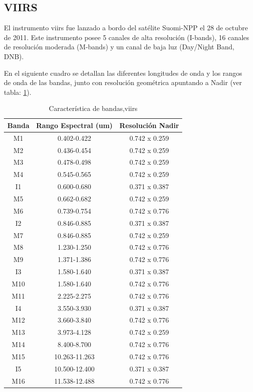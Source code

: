 \subsection{VIIRS}\label{sub:viirs}
El instrumento \ac{viirs} fue lanzado a bordo del satélite Suomi-NPP el 28 de octubre de 2011. Este instrumento posee 5 canales de alta resolución (I-bands), 16 canales de resolución moderada (M-bands) y un canal de baja luz (Day/Night Band, DNB). 

En el siguiente cuadro se detallan las diferentes longitudes de onda y los rangos de onda de las bandas, junto con resolución geométrica apuntando a Nadir (ver tabla: \ref{tab:viirs}).
\begin{table}[H]
\begin{center}
\begin{tabular}{|c|c|c|}
\hline Banda & Rango Espectral (um) & Resolución Nadir \\\hline 
 		M1  & 0.402-0.422   & 0.742 x 0.259 \\ \hline 
		M2  & 0.436-0.454   & 0.742 x 0.259 \\ \hline 
		M3  & 0.478-0.498   & 0.742 x 0.259 \\ \hline 
		M4  & 0.545-0.565   & 0.742 x 0.259 \\ \hline 
		I1  & 0.600-0.680   & 0.371 x 0.387 \\ \hline 
		M5  & 0.662-0.682   & 0.742 x 0.259 \\ \hline 
		M6  & 0.739-0.754   & 0.742 x 0.776 \\ \hline 
		I2  & 0.846-0.885   & 0.371 x 0.387 \\ \hline 
		M7  & 0.846-0.885   & 0.742 x 0.259 \\ \hline 
		M8  & 1.230-1.250   & 0.742 x 0.776 \\ \hline 
		M9  & 1.371-1.386   & 0.742 x 0.776 \\ \hline 
		I3  & 1.580-1.640   & 0.371 x 0.387 \\ \hline 
		M10 & 1.580-1.640   & 0.742 x 0.776 \\ \hline 
		M11 & 2.225-2.275   & 0.742 x 0.776 \\ \hline 
		I4  & 3.550-3.930   & 0.371 x 0.387 \\ \hline 
		M12 & 3.660-3.840   & 0.742 x 0.776 \\ \hline 
		M13 & 3.973-4.128   & 0.742 x 0.259 \\ \hline 
		M14 & 8.400-8.700   & 0.742 x 0.776 \\ \hline 
		M15 & 10.263-11.263 & 0.742 x 0.776 \\ \hline 
		I5  & 10.500-12.400 & 0.371 x 0.387 \\ \hline 
		M16 & 11.538-12.488 & 0.742 x 0.776 \\ \hline 
\end{tabular}
\end{center}\caption{Característica de bandas,\ac{viirs} \label{tab:viirs}}
\end{table}


